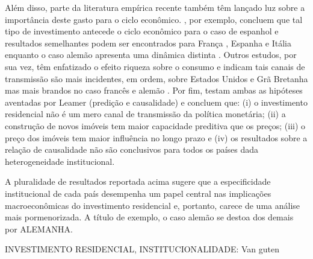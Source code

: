 Além disso, parte da literatura empírica recente também têm lançado luz sobre a importância deste gasto para o ciclo econômico. \textcite{alvarez_does_2010}, por exemplo, concluem que tal tipo de investimento antecede o ciclo econômico para o caso de espanhol e resultados semelhantes podem ser encontrados para França \cite{ferrara_cyclical_2010}, Espanha  e Itália enquanto o caso alemão apresenta uma dinâmica distinta \cite{ferrara_common_2010}. 
Outros estudos, por sua vez, têm enfatizado o efeito riqueza sobre o consumo e indicam tais canais de transmissão são mais incidentes, em ordem, sobre Estados Unidos e Grã Bretanha mas mais brandos no caso francês e alemão \cites{sastre_assessment_2010}{chauvin_wealth_2010}{bassanetti_effects_2010}{arrondel_housing_2010}. Por fim, \textcite{huang_is_2018} testam ambas as hipóteses aventadas por Leamer  (predição e causalidade) e concluem que: (i) o investimento residencial não é um mero canal de transmissão da política monetária; (ii) a construção de novos imóveis tem maior capacidade preditiva que os preços; (iii) o preço dos imóveis tem maior influência no longo prazo e (iv) os resultados sobre a relação de causalidade não são conclusivos para todos os países dada heterogeneidade institucional.

A pluralidade de resultados reportada acima sugere que a especificidade institucional de cada país desempenha um papel central nas implicações macroeconômicas do investimento residencial e, portanto, carece de uma análise mais pormenorizada. A título de exemplo, o caso alemão se destoa dos demais por ALEMANHA. 

INVESTIMENTO RESIDENCIAL, INSTITUCIONALIDADE: Van guten

